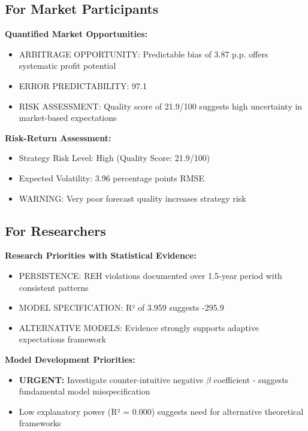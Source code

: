 \documentclass[11pt,a4paper]{article}
\begin{document}
\subsection{For Market Participants}
\textbf{Quantified Market Opportunities:}

\begin{itemize}
\item ARBITRAGE OPPORTUNITY: Predictable bias of 3.87 p.p. offers systematic profit potential
\item ERROR PREDICTABILITY: 97.1%
\item RISK ASSESSMENT: Quality score of 21.9/100 suggests high uncertainty in market-based expectations
\end{itemize}

\textbf{Risk-Return Assessment:}
\begin{itemize}
\item Strategy Risk Level: High (Quality Score: 21.9/100)
\item Expected Volatility: 3.96 percentage points RMSE
\item \textcolor{academicred}{WARNING: Very poor forecast quality increases strategy risk}
\end{itemize}

\subsection{For Researchers}
\textbf{Research Priorities with Statistical Evidence:}

\begin{itemize}
    \item PERSISTENCE: REH violations documented over 1.5-year period with consistent patterns
    \item MODEL SPECIFICATION: R² of 3.959 suggests -295.9%
    \item ALTERNATIVE MODELS: Evidence strongly supports adaptive expectations framework
\end{itemize}

\textbf{Model Development Priorities:}
\begin{itemize}
    \item \textbf{URGENT:} Investigate counter-intuitive negative $\beta$ coefficient - suggests fundamental model misspecification
    \item Low explanatory power (R² = 0.000) suggests need for alternative theoretical frameworks
\end{itemize}
\end{document}
